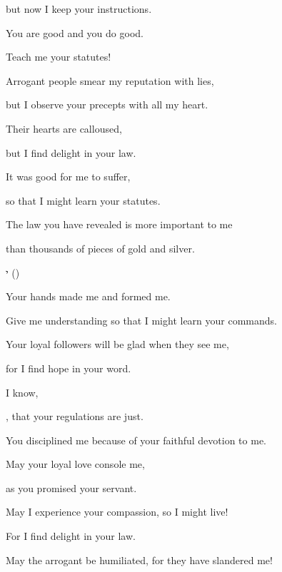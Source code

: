 {\par }{\Q but now
I keep
your instructions.
\par }{\Q {}You are good
and you do good.
\par }{\Q Teach
me your statutes!
\par }{\Q {}Arrogant
people smear
my reputation with lies,
\par }{\Q but I
observe
your precepts
with all
my heart.
\par }{\Q {}Their hearts
are calloused,
\par }{\Q but I
find delight
in your law.
\par }{\Q {}It was good
for
me to suffer,
\par }{\Q so that
I might
learn
your statutes.
\par }{\Q {}The law
you have revealed
is more important
to me
\par }{\Q than thousands
of pieces of gold
and silver.
\par }{\SH י ({})
\par }{\Q {}Your hands made me and formed me.
\par }{\Q Give me understanding so that I might learn your commands.
\par }{\Q {}Your loyal followers
will be glad
when
they see
me,

\par }{\Q for
I find hope
in your word.
\par }{\Q {}I know,

{}, that
your regulations are just.
\par }{\Q You disciplined
me because of your faithful devotion to me.
\par }{\Q {}May
your loyal love
console
me,
\par }{\Q as you promised
your servant.
\par }{\Q {}May I experience
your compassion,
so I might live!
\par }{\Q For
I find delight
in your law.
\par }{\Q {}May the arrogant
be humiliated,
for
they have slandered
me!

}
